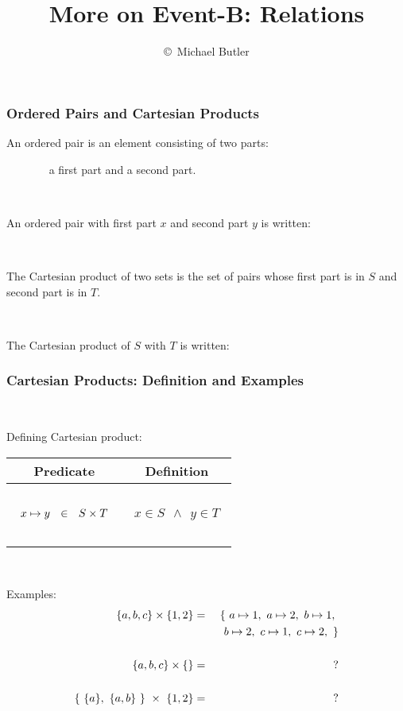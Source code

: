 \documentclass{beamer}
\title{More on Event-B: Relations}
\author{\copyright\ Michael Butler}
\institute{ University of Southampton }
\begin{document}
\begin{frame}

\titlepage

\end{frame}





\begin{frame}
\frametitle{Ordered Pairs and Cartesian Products}

An \alert{ordered pair}  is an element consisting of two parts: 

~~~~~~~ a \alert{first} part and a \alert{second} part.

~

An ordered pair with first part $x$ and second part $y$  is written:~~~~    

~

The \alert{Cartesian product }of two sets is the \alert{set of pairs} whose first part is in $S$ and second part is in $T$.

~

The Cartesian product of $S$ with $T$ is written:~~~


\end{frame}





\begin{frame}

\frametitle{Cartesian Products: Definition and Examples}

~

Defining Cartesian product:
\begin{center}
\begin{tabular}{|c|c|}
\hline
Predicate & Definition \\[2pt] \hline
~&\\
$~~x \mapsto y ~~\in~~ S \times T ~~$ &  $~~x\in S  ~~\land~~ y\in T~~$  \\
~&\\ \hline
\end{tabular}
\end{center}

~

Examples:
\begin{eqnarray*}
	\{a,b,c\} \times \{1,2\} & = &
		\{~ a\mapsto1, ~ a\mapsto2, ~ b\mapsto1, ~ \\
		&& ~~b\mapsto2, ~ c\mapsto1, ~ c\mapsto2, ~\} \\
&\\
	\{a,b,c\} \times \{\} & = & ?\\
&\\
	\{~\{a\},~ \{a,b\}~ \} ~\times~ \{1,2\} & = & ?\\
\end{eqnarray*}

\end{frame}
\end{document}
